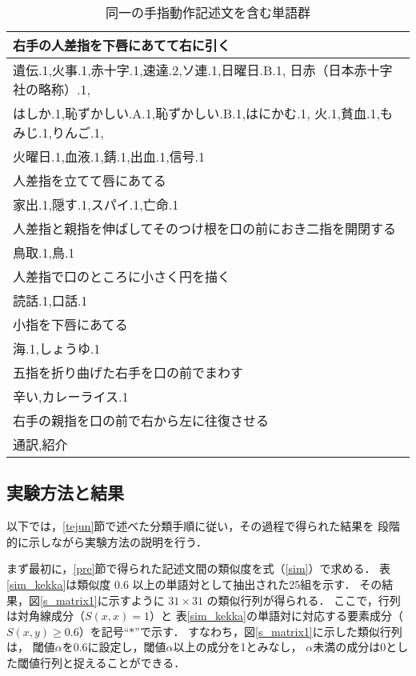\begin{table}[htb]
\caption{同一の手指動作記述文を含む単語群}
\label{marge}
\tabcolsep=3pt\footnotesize
\begin{center}
\begin{tabular}{|l|}\hline
右手の人差指を下唇にあてて右に引く\\ \hline
遺伝.1,火事.1,赤十字.1,速達.2,ソ連.1,日曜日.B.1,
日赤（日本赤十字社の略称）.1,\\
はしか.1,恥ずかしい.A.1,恥ずかしい.B.1,はにかむ.1,
火.1,貧血.1,もみじ.1,りんご.1,\\
火曜日.1,血液.1,錆.1,出血.1,信号.1\\ \hline
人差指を立てて唇にあてる\\ \hline
家出.1,隠す.1,スパイ.1,亡命.1\\ \hline
人差指と親指を伸ばしてそのつけ根を口の前におき二指を開閉する\\ \hline
鳥取.1,鳥.1\\ \hline
人差指で口のところに小さく円を描く\\ \hline
読話.1,口話.1\\ \hline
小指を下唇にあてる\\ \hline
海.1,しょうゆ.1\\ \hline
五指を折り曲げた右手を口の前でまわす\\ \hline
辛い,カレーライス.1\\ \hline
右手の親指を口の前で右から左に往復させる\\ \hline
通訳,紹介\\ \hline
\end{tabular}
\end{center}
\end{table}


\subsection {実験方法と結果}

以下では，\ref{tejun}節で述べた分類手順に従い，その過程で得られた結果を
段階的に示しながら実験方法の説明を行う．

まず最初に，\ref{pre}節で得られた記述文間の類似度を式（\ref{sim}）で求める．
表\ref{sim_kekka}は類似度 $0.6$ 以上の単語対として抽出された25組を示す．
その結果，図\ref{s_matrix1}に示すように $31\times 31$ の類似行列が得られる．
ここで，行列は対角線成分（$S(x,x)=1$）と
表\ref{sim_kekka}の単語対に対応する要素成分（$S(x,y)\ge 0.6$）を記号``$\ast$''で示す．
すなわち，図\ref{s_matrix1}に示した類似行列は，
閾値$\alpha$を$0.6$に設定し，閾値$\alpha$以上の成分を1とみなし，
$\alpha$未満の成分は0とした閾値行列と捉えることができる．


